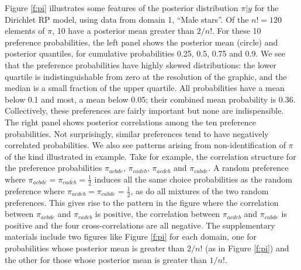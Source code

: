 \documentclass[11pt,letter]{article}
\newcommand{\Dpi}{Dirichlet RP model}
\begin{document}
Figure \ref{f:pi} illustrates some features of the posterior distribution $\pi|y$ for the \Dpi{}, using data from domain 1, ``Male stars''.
Of the $n! = 120$ elements of $\pi$, 10 have a posterior mean greater than $2/n!$.
For these 10 preference probabilities, the left panel shows the posterior mean (circle) and posterior quantiles, for cumulative probabilities 0.25, 0.5, 0.75 and 0.9.
We see that the preference probabilities have highly skewed distributions: the lower quartile is indistinguishable from zero at the resolution of the graphic, and the median is a small fraction of the upper quartile.
All probabilities have a mean below 0.1 and most, a mean below 0.05; their combined mean probability is 0.36.
Collectively, these preferences are fairly important but none are indispensible.
The right panel shows posterior correlations among the ten preference probabilities.
Not surprisingly, similar preferences tend to have negatively correlated probabilities.
We also see patterns arising from non-identification of $\pi$ of the kind illustrated in  example.
Take for example, the correlation structure for the preference probabilities $\pi_{acbde}$, $\pi_{cadeb}$, $\pi_{acdeb}$ and $\pi_{cabde}$.
A random preference where $\pi_{acbde} = \pi_{cadeb} = \tfrac{1}{2}$ induces all the same choice probabilities as the random preference where $\pi_{acdeb} = \pi_{cabde} = \tfrac{1}{2}$, as do all mixtures of the two random preferences.
This gives rise to the pattern in the figure where the correlation between $\pi_{acbde}$ and $\pi_{cadeb}$ is positive, the correlation between $\pi_{acdeb}$ and $\pi_{cabde}$ is positive and the four cross-correlations are all negative.
The supplementary materials include two figures like Figure \ref{f:pi} for each domain, one for probabilities whose posterior mean is greater than $2/n!$ (as in Figure \ref{f:pi}) and the other for those whose posterior mean is greater than $1/n!$.
\end{document}
